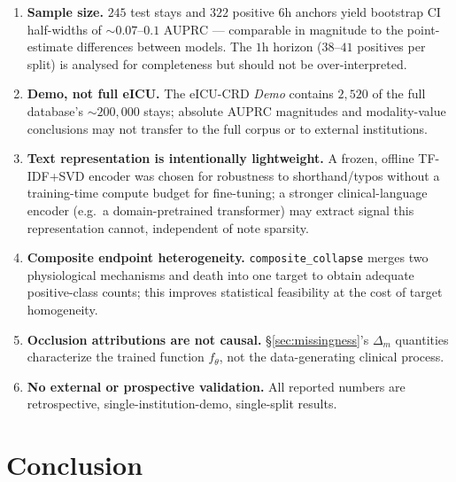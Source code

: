 \documentclass[11pt]{article}
\newcommand{\1}[1]{\mathbf{1}\!\left[#1\right]}
\begin{document}
\begin{enumerate}
\item \textbf{Sample size.} $245$ test stays and $322$ positive $6$h anchors yield bootstrap CI half-widths of $\sim0.07$--$0.1$ AUPRC — comparable in magnitude to the point-estimate differences between models. The $1$h horizon ($38$--$41$ positives per split) is analysed for completeness but should not be over-interpreted.
\item \textbf{Demo, not full eICU.} The eICU-CRD \emph{Demo} contains $2{,}520$ of the full database's $\sim200{,}000$ stays; absolute AUPRC magnitudes and modality-value conclusions may not transfer to the full corpus or to external institutions.
\item \textbf{Text representation is intentionally lightweight.} A frozen, offline TF-IDF+SVD encoder was chosen for robustness to shorthand/typos without a training-time compute budget for fine-tuning; a stronger clinical-language encoder (e.g.\ a domain-pretrained transformer) may extract signal this representation cannot, independent of note sparsity.
\item \textbf{Composite endpoint heterogeneity.} \texttt{composite\_collapse} merges two physiological mechanisms and death into one target to obtain adequate positive-class counts; this improves statistical feasibility at the cost of target homogeneity.
\item \textbf{Occlusion attributions are not causal.} \S\ref{sec:missingness}'s $\Delta_m$ quantities characterize the trained function $f_\theta$, not the data-generating clinical process.
\item \textbf{No external or prospective validation.} All reported numbers are retrospective, single-institution-demo, single-split results.
\end{enumerate}

\section{Conclusion}
\end{document}

